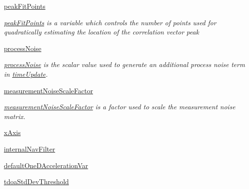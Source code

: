 \begin{DoxyCompactItemize}
\hyperlink{classmodest_1_1substates_1_1correlationvector_1_1CorrelationVector_af2be8d7129fd0453208af5268fdddc22}{peak\+Fit\+Points}
\begin{DoxyCompactList}\small\item\em \hyperlink{classmodest_1_1substates_1_1correlationvector_1_1CorrelationVector_af2be8d7129fd0453208af5268fdddc22}{peak\+Fit\+Points} is a variable which controls the number of points used for quadratically estimating the location of the correlation vector peak \end{DoxyCompactList}\item 
\hyperlink{classmodest_1_1substates_1_1correlationvector_1_1CorrelationVector_ab1756128cdec161ea22557d756745195}{process\+Noise}
\begin{DoxyCompactList}\small\item\em \hyperlink{classmodest_1_1substates_1_1correlationvector_1_1CorrelationVector_ab1756128cdec161ea22557d756745195}{process\+Noise} is the scalar value used to generate an additional process noise term in \hyperlink{classmodest_1_1substates_1_1correlationvector_1_1CorrelationVector_a59c13e5fa26ba27717494f687ec78ef8}{time\+Update}. \end{DoxyCompactList}\item 
\hyperlink{classmodest_1_1substates_1_1correlationvector_1_1CorrelationVector_ae1c71753aea17170b58bd9fabc62c037}{measurement\+Noise\+Scale\+Factor}
\begin{DoxyCompactList}\small\item\em \hyperlink{classmodest_1_1substates_1_1correlationvector_1_1CorrelationVector_ae1c71753aea17170b58bd9fabc62c037}{measurement\+Noise\+Scale\+Factor} is a factor used to scale the measurement noise matrix. \end{DoxyCompactList}\item 
\hyperlink{classmodest_1_1substates_1_1correlationvector_1_1CorrelationVector_a5fe4b7582cf8dae6736ab3fbacf7a781}{x\+Axis}
\item 
\hyperlink{classmodest_1_1substates_1_1correlationvector_1_1CorrelationVector_abed97a9642f23c9a7306d173ba37b428}{internal\+Nav\+Filter}
\item 
\hyperlink{classmodest_1_1substates_1_1correlationvector_1_1CorrelationVector_abbc206d7f36f091433e8cffb5cd15f28}{default\+One\+D\+Acceleration\+Var}
\item 
\hyperlink{classmodest_1_1substates_1_1correlationvector_1_1CorrelationVector_ac8e351a4b25657857ed7cbcbc6c3c006}{tdoa\+Std\+Dev\+Threshold}
\item 

\end{DoxyCompactItemize}

